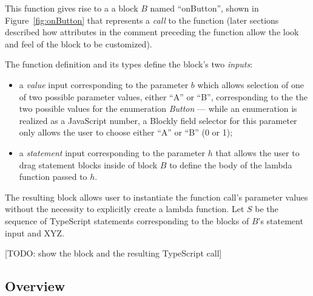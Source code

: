 This function gives rise to a 
a block $B$ named ``onButton'', shown in Figure~\ref{fig:onButton}
that represents a \emph{call} to the function
(later sections described how attributes in the comment preceding
the function allow the look and feel of the block to be customized).

The function definition and its types define the block's two \emph{inputs}:
\begin{itemize}
\item  a \emph{value} input corresponding to the parameter
$b$ which allows selection of one of two 
possible parameter values, either ``A'' or ``B'', corresponding to the
the two possible values for the enumeration \emph{Button} ---
while an enumeration is realized as a JavaScript number, a 
Blockly field selector for this parameter only allows
the user to choose either ``A'' or ``B'' (0 or 1);
\item a \emph{statement} input corresponding to the parameter $h$
that allows the user to drag statement blocks inside of block $B$
to define the body of the lambda function passed to $h$.
\end{itemize}
The resulting block allows user to instantiate the function call's
parameter values without the necessity to explicitly create a 
lambda function.  Let $S$ be the sequence of TypeScript statements
corresponding to the blocks of $B$'s statement input and XYZ. 

[TODO: show the block and the resulting TypeScript call]



\subsection{Overview}





